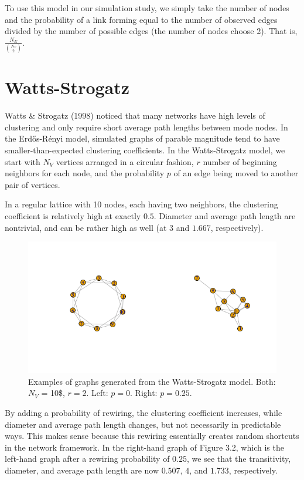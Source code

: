 \documentclass[12pt,twoside]{amherstthesis}
\begin{document}
  To use this model in our simulation study, we simply take the number of
  nodes and the probability of a link forming equal to the number of
  observed edges divided by the number of possible edges (the number of
  nodes choose 2). That is, \(\frac{N_{E}} {{N_{V} \choose 2}}\).
  
  \section{Watts-Strogatz}\label{watts-strogatz}
  
  Watts \& Strogatz (1998) noticed that many networks have high levels of
  clustering and only require short average path lengths between mode
  nodes. In the Erdős-Rényi model, simulated graphs of parable magnitude
  tend to have smaller-than-expected clustering coefficients. In the
  Watts-Strogatz model, we start with \(N_V\) vertices arranged in a
  circular fashion, \(r\) number of beginning neighbors for each node, and
  the probability \(p\) of an edge being moved to another pair of
  vertices.
  
  In a regular lattice with 10 nodes, each having two neighbors, the
  clustering coefficient is relatively high at exactly \(0.5\). Diameter
  and average path length are nontrivial, and can be rather high as well
  (at \(3\) and \(1.667\), respectively).
  
  \begin{figure}[htbp]
  \centering
  \includegraphics{figure/22wattsstrogatzexample.png}
  \caption{Examples of graphs generated from the Watts-Strogatz model.
  Both: \(N_V\) = 10\$, \(r = 2\). Left: \(p = 0\). Right: \(p= 0.25\).}
  \end{figure}
  
  By adding a probability of rewiring, the clustering coefficient
  increases, while diameter and average path length changes, but not
  necessarily in predictable ways. This makes sense because this rewiring
  essentially creates random shortcuts in the network framework. In the
  right-hand graph of Figure 3.2, which is the left-hand graph after a
  rewiring probability of \(0.25\), we see that the transitivity,
  diameter, and average path length are now \(0.507\), \(4\), and
  \(1.733\), respectively.
  
\end{document}
